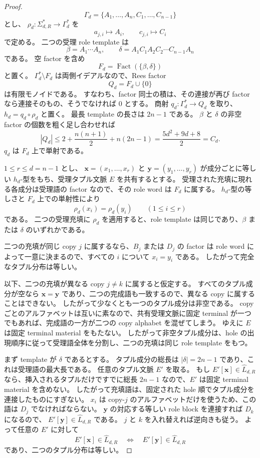 \documentclass[10pt,a4paper]{ltjsarticle}
\theoremstyle{definition}
\theoremstyle{remark}
\begin{document}
\begin{proof}
\[
\Gamma_d=\{A_1,\ldots,A_n,C_1,\ldots,C_{n-1}\}
\]
とし、
$\rho_d:\Sigma_{d,R}^*\to\Gamma_d^*$
を
\[
a_{j,i}\mapsto A_i,
\qquad
c_{j,i}\mapsto C_i
\]
で定める。
二つの受理 role template は
\[
\beta=A_1\cdots A_n,
\qquad
\delta=A_1C_1A_2C_2\cdots C_{n-1}A_n
\]
である。
空 factor を含め
\[
F_d=\operatorname{Fact}(\{\beta,\delta\})
\]
と置く。
$\Gamma_d^*\setminus F_d$ は両側イデアルなので、Rees factor
\[
Q_d=F_d\cup\{0\}
\]
は有限モノイドである。
すなわち、factor 同士の積は、その連接が再び factor なら連接そのもの、そうでなければ $0$ とする。
商射 $q_d:\Gamma_d^*\to Q_d$ を取り、
$h_d=q_d\circ\rho_d$
と置く。
最長 template の長さは $2n-1$ である。
$\beta$ と $\delta$ の非空 factor の個数を粗く足し合わせれば
\[
|Q_d|
\le
2+\frac{n(n+1)}2+n(2n-1)
=\frac{5d^2+9d+8}{2}
=C_d.
\]
$q_d$ は $F_d$ 上で単射である。

$1\le r\le d=n-1$ とし、
$\mathbf x=(x_1,\ldots,x_r)$ と
$\mathbf y=(y_1,\ldots,y_r)$
が成分ごとに等しい $h_d$-型をもち、受理タプル文脈 $E$ を共有するとする。
受理された充填に現れる各成分は受理語の factor なので、その role word は $F_d$ に属する。
$h_d$-型の等しさと $F_d$ 上での単射性により
\[
\rho_d(x_i)=\rho_d(y_i)
\qquad(1\le i\le r)
\]
である。
二つの受理充填に $\rho_d$ を適用すると、role template は同じであり、$\beta$ または $\delta$ のいずれかである。

二つの充填が同じ copy $j$ に属するなら、$B_j$ または $D_j$ の factor は role word によって一意に決まるので、すべての $i$ について $x_i=y_i$ である。
したがって完全なタプル分布は等しい。

以下、二つの充填が異なる copy $j\ne k$ に属すると仮定する。
すべてのタプル成分が空なら $\mathbf x=\mathbf y$ であり、二つの完成語も一致するので、異なる copy に属することはできない。
したがって少なくとも一つのタプル成分は非空である。
copy ごとのアルファベットは互いに素なので、共有受理文脈に固定 terminal が一つでもあれば、完成語の一方が二つの copy alphabet を混ぜてしまう。
ゆえに $E$ は固定 terminal material をもたない。
したがって非空タプル成分は、hole の出現順序に従って受理語全体を分割し、二つの充填は同じ role template をもつ。

まず template が $\delta$ であるとする。
タプル成分の総長は $|\delta|=2n-1$ であり、これは受理語の最大長である。
任意のタプル文脈 $E'$ を取る。
もし
$E'[\mathbf x]\in\widehat L_{d,R}$
なら、挿入されるタプルだけですでに総長 $2n-1$ なので、$E'$ は固定 terminal material を含めない。
したがって充填語は、固定された hole 順でタプル成分を連接したものにすぎない。
$x_i$ は copy-$j$ のアルファベットだけを使うため、この語は $D_j$ でなければならない。
$\mathbf y$ の対応する等しい role block を連接すれば $D_k$ になるので、
$E'[\mathbf y]\in\widehat L_{d,R}$
である。
$j$ と $k$ を入れ替えれば逆向きも従う。
よって任意の $E'$ に対して
\[
E'[\mathbf x]\in\widehat L_{d,R}
\quad\Longleftrightarrow\quad
E'[\mathbf y]\in\widehat L_{d,R}
\]
であり、二つのタプル分布は等しい。


\end{proof}
\end{document}
